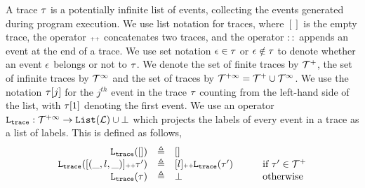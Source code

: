 A trace $\mathtt{\tau}$ is a potentially infinite list of events, 
collecting the events generated  during program execution. 
We use list notation for traces, where $[]$ is the empty trace,
the operator ${\scriptscriptstyle ++}$ concatenates two traces, and the operator $::$ appends an event at the end of a trace. We use set notation $\mathtt{\epsilon} \in \mathtt{\tau}$ or $\mathtt{\epsilon} \notin \mathtt{\tau}$ to denote whether an event $\mathtt{\epsilon}$ belongs or not to $\mathtt{\tau}$.
We denote the set of finite traces by $\mathcal{T}^{+}$, the set of infinite traces by $\mathcal{T}^{\infty}$ and the set of traces by $\mathcal{T}^{+\infty} = \mathcal{T}^{+} \cup \mathcal{T}^{\infty}$.
We use the notation $\mathtt{\tau}[j]$ for the $j^{th}$ event in the trace $\mathtt{\tau}$ counting from the left-hand side
of the list,
with $\mathtt{\tau}[1]$ denoting the first event.
%
We use an operator $\mathtt{L}_{\mathtt{{trace}}}: \mathcal{T}^{+\infty} \to \mathtt{List}(\mathcal{L})\cup \bot$ which projects the labels of every event in a trace as a list of labels. This is defined as follows,
%
\[
\begin{array}{rcll}
\mathtt{L}_{\mathtt{{trace}}}([]) &\triangleq & [] &\qquad  
\\ 
\mathtt{L}_{\mathtt{{trace}}}([(\_, l, \_)] {\scriptscriptstyle ++} \mathtt{\tau}') &\triangleq & [l] {\scriptscriptstyle ++} \mathtt{L}_{\mathtt{{trace}}}(\mathtt{\tau}') &\qquad  \mbox{if}\ \mathtt{\tau}'\in\mathcal{T}^{+}
\\
\mathtt{L}_{\mathtt{{trace}}}(\tau) &\triangleq & \bot  &\qquad  \mbox{otherwise}
\end{array}
\]
%
